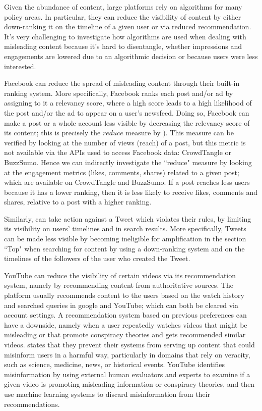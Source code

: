 \documentclass[Afour,sageh,times]{sagej}
\begin{document}
Given the abundance of content, large platforms rely on algorithms for many policy areas. 
In particular, they can reduce the visibility of content by either down-ranking it on the timeline of a given user or via reduced recommendation. 
It's very challenging to investigate how algorithms are used when dealing with misleading content because it's hard to disentangle, whether impressions and engagements are lowered due to an algorithmic decision or because users were less interested.  

Facebook can reduce the spread of misleading content through their built-in ranking system. More specifically, Facebook ranks each post and/or ad by assigning to it a relevancy score, where a high score leads to a high likelihood of the post and/or the ad to appear on a user's newsfeed. 
Doing so, Facebook can make a post or a whole account less visible by decreasing the relevancy score of its content; this is precisely the $reduce$ measure by \cite{newsroom2}). 
This measure can be verified by looking at the number of views (reach) of a post, but this metric is not available via the APIs used to access Facebook data: CrowdTangle or BuzzSumo. Hence we can indirectly investigate the ``reduce" measure by looking at the engagement metrics (likes, comments, shares) related to a given post; which are available on CrowdTangle and BuzzSumo. 
If a post reaches less users because it has a lower ranking, then it is less likely to receive likes, comments and shares, relative to a post with a higher ranking. 

Similarly, \cite{twittervisibility} can take action against a Tweet which violates their rules, by limiting its visibility on users' timelines and in search results. 
More specifically, Tweets can be made less visible by becoming ineligible for amplification in the section ``Top" when searching for content by using a down-ranking system and on the timelines of the followers of the user who created the Tweet.  

YouTube can reduce the visibility of certain videos via its recommendation system, namely by recommending content from authoritative sources. 
The platform usually recommends content to the users based on the watch history and searched queries in google and YouTube; which can both be cleared via account settings. 
A recommendation system based on previous preferences can have a downside, namely when a user repeatedly watches videos that might be misleading or that promote conspiracy theories and gets recommended similar videos. 
\cite{youtubemisinfo} states that they prevent their systems from serving up content that could misinform users in a harmful way, particularly in domains that rely on veracity, such as science, medicine, news, or historical events. 
YouTube identifies misinformation by using external human evaluators and experts to examine if a given video is promoting misleading information or conspiracy theories, and then use machine learning systems to discard misinformation from their recommendations. %
\end{document}
